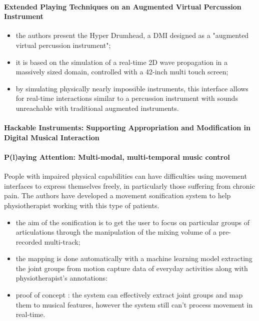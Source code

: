 \documentclass[11pt]{article}
\begin{document}
\paragraph{Extended Playing Techniques on an Augmented Virtual Percussion Instrument} \citep{zappi_dimensionality_2014}

\begin{itemize}
    \item the authors present the Hyper Drumhead, a DMI designed as a "augmented virtual percussion instrument";
    \item it is based on the simulation of a real-time 2D wave propagation in a massively sized domain, controlled with a 42-inch multi touch screen;
    \item by simulating physically nearly impossible instruments, this interface allows for real-time interactions similar to a percussion instrument with sounds unreachable with traditional augmented instruments.
\end{itemize}

\paragraph{Hackable Instruments: Supporting Appropriation and Modification in Digital Musical Interaction} \citep{zappi_dimensionality_2014}


\paragraph{P(l)aying Attention: Multi-modal, multi-temporal music control} \citep{gold_playing_2020}

People with impaired physical capabilities can have difficulties using movement interfaces to express themselves freely, in particularly those suffering from chronic pain. The authors have developed a movement sonification system to help physiotherapist working with this type of patients.
\begin{itemize}
    \item the aim of the sonification is to get the user to focus on particular groups of articulations through the manipulation of the mixing volume of a pre-recorded multi-track;
    \item the mapping is done automatically with a machine learning model extracting the joint groups from motion capture data of everyday activities along with physiotherapist's annotations: 
    \item proof of concept : the system can effectively extract joint groups and map them to musical features, however the system still can't process movement in real-time.
\end{itemize}
\end{document}

